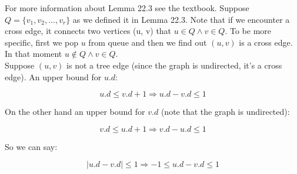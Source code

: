 \documentclass{book}
\begin{document}
	For more information about Lemma 22.3 see the textbook. Suppose $Q = \{v_1, v_2, \dots , v_r\}$ as we defined it in Lemma 22.3. Note that if we encounter a cross edge, it connects two vertices (u, v) that $u \in Q \land v \in Q$. To be more specific, first we pop $u$ from queue and then we find out $(u, v)$ is a cross edge. In that moment $u \notin Q \land v \in Q$.\\
	
	Suppose $(u, v)$ is not a tree edge (since the graph is undirected, it's a cross edge). An upper bound for $u.d$:
	
	\begin{equation*}
	u.d \le v.d + 1 \Rightarrow u.d - v.d \le 1
	\end{equation*}
	
	On the other hand an upper bound for $v.d$ (note that the graph is undirected):
	
	\begin{equation*}
	v.d \le u.d + 1 \Rightarrow v.d - u.d \le 1
	\end{equation*}
	
	So we can say:
	
	\begin{equation*}
		|u.d - v.d| \le 1 \Rightarrow -1 \le u.d - v.d \le 1
	\end{equation*}
	
\end{document}
